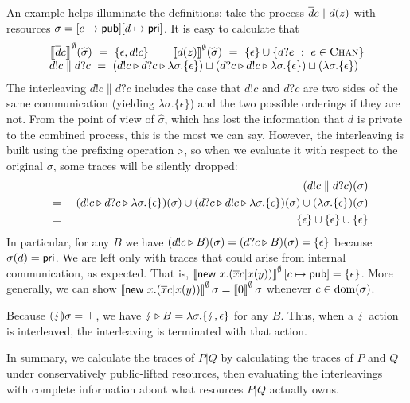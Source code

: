\documentclass{entcs}
\begin{document}
An example helps illuminate the definitions: take the process
$\overline{d}c\ |\ d(z)$ with resources $\sigma = [c \mapsto \textsf{pub}][d \mapsto
  \textsf{pri}]$.  It is easy to
calculate that
\[
\begin{array}{l}
\Sem{\ov{d}c}{\emptyset}\!(\widehat{\sigma})\ =\ 
  \{ \epsilon, d!c \}
\qquad
\Sem{d(z)}{\emptyset}\!(\widehat{\sigma})\ =\ 
  \{ \epsilon \} \cup \{ d?e\ :\ e \in \textsc{Chan} \}
\\
d!c \parallel d?c 
\ =\ 
\left(d!c \pref d?c \pref \lambda \sigma. \{\epsilon\}\right)
\lub
\left(d?c \pref d!c \pref \lambda \sigma. \{\epsilon\}\right)
\lub
\left(\lambda \sigma. \{\epsilon\}\right)
\end{array}
\]
The interleaving $d!c \parallel d?c$ includes the case that $d!c$ and
$d?c$ are two sides of the same communication (yielding $\lambda
\sigma. \{\epsilon\}$) and the two possible orderings if they are not.
From the point of view of $\widehat{\sigma}$, which has lost the
information that $d$ is private to the combined process, this is the
most we can say.  However, the interleaving is built using the
prefixing operation $\triangleright$, so when we evaluate it with respect to
the original $\sigma$, some traces will be silently dropped:
\begin{eqnarray*}
&&      (d!c \parallel d?c)(\sigma)\\
&\ =\ &        
        (d!c \triangleright d?c \triangleright \lambda \sigma. \{\epsilon\})(\sigma)
        \cup 
        (d?c \triangleright d!c \triangleright \lambda \sigma. \{\epsilon\})(\sigma)
        \cup
        (\lambda \sigma. \{\epsilon\})
(\sigma) \\
&\ =\ &        
        \{ \epsilon \} \cup
        \{ \epsilon \} \cup
        \{ \epsilon \}
\end{eqnarray*}
In particular, for any $B$ we have 
$
(d!c \triangleright B)(\sigma) = (d?c \triangleright B)(\sigma) = \{ \epsilon \}
$
because $\sigma(d) = \textsf{pri}$.  We are left only with traces that could
arise from internal communication, as expected.  That is, 
$\left\llbracket \textsf{new } x.(\overline{x}c|x(y)) \right\rrbracket^{\emptyset}[c \mapsto\textsf{pub}] = \{ \epsilon \}$.
More generally, we can show 
$\left\llbracket \textsf{new } x.(\overline{x}c|x(y)) \right\rrbracket^{\emptyset}\sigma = \left\llbracket 0 \right\rrbracket^{\emptyset}\sigma$
whenever $c \in \textrm{dom}(\sigma)$.

Because $\llparenthesis \lightning \rrparenthesis \sigma = \top$, we have $\lightning \triangleright B =
\lambda \sigma. \{ \lightning, \epsilon \}$ for any $B$.  Thus, when a
$\lightning$ action is interleaved, the interleaving is terminated with
that action.

In summary, we calculate the traces of $P|Q$ by calculating the traces
of $P$ and $Q$ under conservatively public-lifted resources, then
evaluating the interleavings with complete information about what
resources $P|Q$ actually owns.
\end{document}
